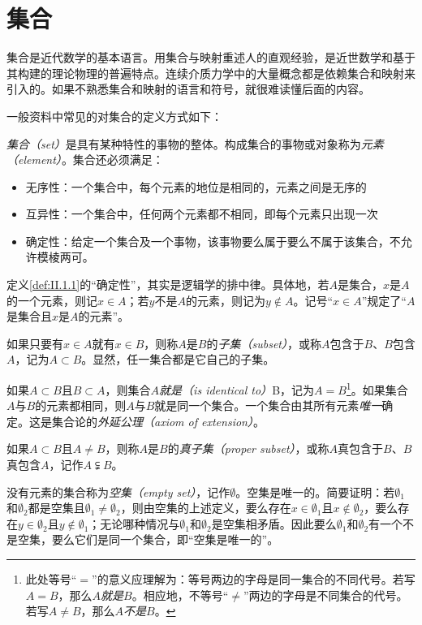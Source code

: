 \documentclass[../main.tex]{subfiles}
\begin{document}
\section{集合}
集合是近代数学的基本语言。用集合与映射重述人的直观经验，是近世数学和基于其构建的理论物理的普遍特点。连续介质力学中的大量概念都是依赖集合和映射来引入的。如果不熟悉集合和映射的语言和符号，就很难读懂后面的内容。

一般资料中常见的对集合的定义方式如下：

\begin{definition}\label{def:II.1.1}
    \emph{集合（set）}是具有某种特性的事物的整体。构成集合的事物或对象称为\emph{元素（element）}。集合还必须满足：
    \begin{itemize}
        \item 无序性：一个集合中，每个元素的地位是相同的，元素之间是无序的
        \item 互异性：一个集合中，任何两个元素都不相同，即每个元素只出现一次
        \item 确定性：给定一个集合及一个事物，该事物要么属于要么不属于该集合，不允许模棱两可。
    \end{itemize}
\end{definition}

定义\ref{def:II.1.1}的“确定性”，其实是逻辑学的排中律。具体地，若$A$是集合，$x$是$A$的一个元素，则记$x\in A$；若$y$不是$A$的元素，则记为$y\notin A$。记号“$x\in A$”规定了“$A$是集合且$x$是$A$的元素”。

如果只要有$x\in A$就有$x\in B$，则称$A$是$B$的\emph{子集（subset）}，或称$A$包含于$B$、$B$包含$A$，记为$A\subset B$。显然，任一集合都是它自己的子集。

如果$A\subset B$且$B\subset A$，则集合$A$\emph{就是（is identical to）}B，记为$A=B$\footnote{此处等号“$=$”的意义应理解为：等号两边的字母是同一集合的不同代号。若写$A=B$，那么$A$\emph{就是}$B$。相应地，不等号“$\neq$”两边的字母是不同集合的代号。若写$A\neq B$，那么$A$\emph{不是}$B$。}。如果集合$A$与$B$的元素都相同，则$A$与$B$就是同一个集合。一个集合由其所有元素\emph{唯一}确定。这是集合论的\emph{外延公理（axiom of extension）}。

如果$A\subset B$且$A\neq B$，则称$A$是$B$的\emph{真子集（proper subset）}，或称$A$真包含于$B$、$B$真包含$A$，记作$A\subsetneqq B$。

没有元素的集合称为\emph{空集（empty set）}，记作$\emptyset$。空集是唯一的。简要证明：若$\emptyset_1$和$\emptyset_2$都是空集且$\emptyset_1\neq\emptyset_2$，则由空集的上述定义，要么存在$x\in\emptyset_1$且$x\notin\emptyset_2$，要么存在$y\in\emptyset_2$且$y\notin\emptyset_1$；无论哪种情况与$\emptyset_1$和$\emptyset_2$是空集相矛盾。因此要么$\emptyset_1$和$\emptyset_2$有一个不是空集，要么它们是同一个集合，即“空集是唯一的”。
\end{document}
